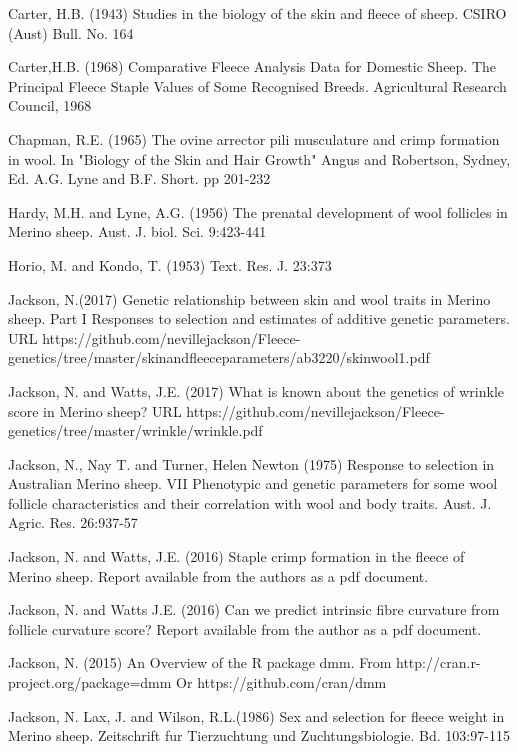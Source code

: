 \documentclass[titlepage]{article}  %
\begin{document}
\begin{thebibliography}{99}

Carter, H.B. (1943) Studies in the biology of the skin and fleece of sheep. CSIRO (Aust) Bull. No. 164

Carter,H.B. (1968) Comparative Fleece Analysis Data for Domestic Sheep. The Principal Fleece Staple Values of Some Recognised Breeds. Agricultural Research Council, 1968


Chapman, R.E. (1965) The ovine arrector pili musculature and crimp formation 
    in wool. In "Biology of the Skin and Hair Growth" Angus and Robertson,
    Sydney, Ed. A.G. Lyne and B.F. Short. pp 201-232

Hardy, M.H. and Lyne, A.G. (1956) The prenatal development of wool follicles in Merino sheep. Aust. J. biol. Sci. 9:423-441

Horio, M. and Kondo, T. (1953) Text. Res. J. 23:373

Jackson, N.(2017) Genetic relationship between skin and wool traits in Merino sheep. Part I Responses to selection and estimates of additive genetic parameters. URL https://github.com/nevillejackson/Fleece-genetics/tree/master/skinandfleeceparameters/ab3220/skinwool1.pdf

Jackson, N. and Watts, J.E. (2017) What is known about the genetics of wrinkle score in Merino sheep? URL https://github.com/nevillejackson/Fleece-genetics/tree/master/wrinkle/wrinkle.pdf

Jackson, N., Nay T. and Turner, Helen Newton (1975) Response to selection
    in Australian Merino sheep. VII Phenotypic and genetic parameters for
    some wool follicle characteristics and their correlation with wool and
    body traits. Aust. J. Agric. Res. 26:937-57

Jackson, N. and Watts, J.E. (2016) Staple crimp formation in the fleece of Merino sheep. 
Report available from the authors as a pdf document.

Jackson, N.  and Watts J.E. (2016) Can we predict intrinsic fibre curvature from follicle curvature score? Report available from the author as a pdf document.

Jackson, N. (2015) An Overview of the R package dmm.
    From http://cran.r-project.org/package=dmm
    Or https://github.com/cran/dmm

Jackson, N. Lax, J. and Wilson, R.L.(1986) Sex and selection for fleece weight in Merino sheep. Zeitschrift fur Tierzuchtung und Zuchtungsbiologie. Bd. 103:97-115


\end{thebibliography}
\end{document}

